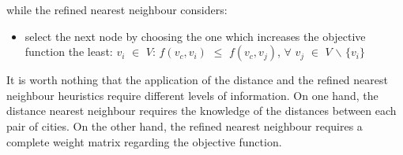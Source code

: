 while the refined nearest neighbour considers:


\begin{itemize}
    \item select the next node by choosing the one which increases the objective function the least: \newline
    $v_i$ $\in$ $V$: $f(v_c, v_i)$ $\leq$ $f(v_c, v_j)$,
    $\forall$ $v_j$ $\in$ $V$ $\backslash$ $\{v_i\}$   
\end{itemize}

It is worth nothing that the application of the distance and the refined nearest neighbour heuristics require different levels of information. On one hand, the distance nearest neighbour requires the knowledge of the distances between each pair of cities. On the other hand, the refined nearest neighbour requires a complete weight matrix regarding the objective function.




